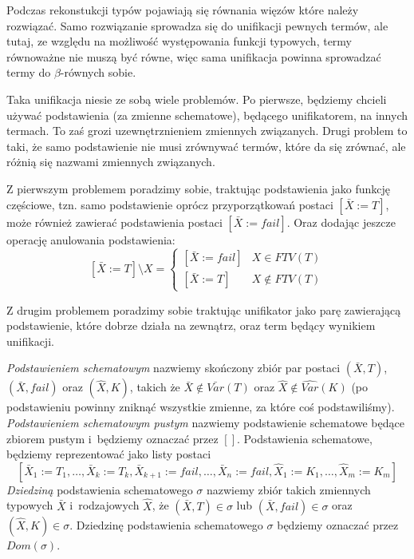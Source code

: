 \documentclass[11pt,leqno]{article}
\begin{document}
Podczas rekonstukcji typów pojawiają się równania więzów które należy rozwiązać. Samo rozwiązanie
sprowadza się do unifikacji pewnych termów, ale tutaj, ze względu na możliwość występowania funkcji
typowych, termy równoważne nie muszą być równe, więc sama unifikacja powinna sprowadzać termy do
$\beta$-równych sobie.

Taka unifikacja niesie ze sobą wiele problemów. Po pierwsze, będziemy chcieli używać podstawienia (za zmienne schematowe),
będącego unifikatorem, na innych termach. To zaś grozi uzewnętrznieniem zmiennych związanych. Drugi
problem to taki, że samo podstawienie nie musi zrównywać termów, które da się zrównać, ale różnią się
nazwami zmiennych związanych.

Z pierwszym problemem poradzimy sobie, traktując podstawienia jako funkcję częściowe, tzn. samo podstawienie
oprócz przyporzątkowań postaci $[\bar{X} := T]$, może również zawierać podstawienia postaci $[\bar{X} := fail]$.
Oraz dodając jeszcze operację anulowania podstawienia:
\[
[\bar{X} := T] \setminus X = 
\begin{cases}
[\bar{X} := fail] & X \in    FTV(T) \\
[\bar{X} := T]    & X \notin FTV(T)
\end{cases}
\]

Z drugim problemem poradzimy sobie traktując unifikator jako parę zawierającą podstawienie, które dobrze działa
na zewnątrz, oraz term będący wynikiem unifikacji.

\begin{definicja}
\emph{Podstawieniem schematowym} nazwiemy skończony zbiór par postaci $(\bar{X},T)$, $(\bar{X},fail)$ oraz $(\widehat{X},K)$, takich że
$\bar{X} \notin \bar{Var}(T)$ oraz $\widehat{X} \notin \widehat{Var}(K)$ (po podstawieniu powinny zniknąć wszystkie zmienne, za 
które coś podstawiliśmy). 
\emph{Podstawieniem schematowym pustym} nazwiemy podstawienie schematowe będące zbiorem pustym i~będziemy oznaczać przez $[]$.
Podstawienia schematowe, będziemy reprezentować jako listy postaci
\[
[\bar{X}_1 := T_1, \dots, \bar{X}_k := T_k, \bar{X}_{k+1} := fail, \dots , \bar{X}_n := fail, \widehat{X}_1 := K_1, \dots, \widehat{X}_m := K_m]
\]
\emph{Dziedziną} podstawienia schematowego $\sigma$ nazwiemy zbiór takich zmiennych typowych $\bar{X}$ i~rodzajowych $\widehat{X}$, że
$(\bar{X}, T) \in \sigma$ lub $(\bar{X}, fail) \in \sigma$ oraz $(\widehat{X}, K) \in \sigma$. Dziedzinę podstawienia schematowego $\sigma$
będziemy oznaczać przez $Dom(\sigma)$.
\end{definicja}
\end{document}
